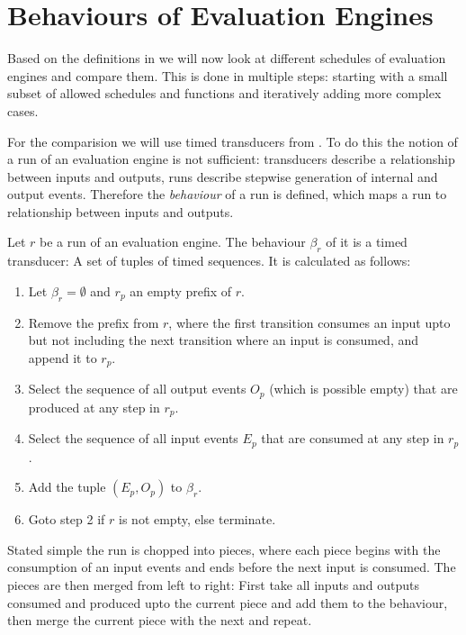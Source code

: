 \chapter{Behaviours of Evaluation Engines}
\label{sec:behaviours}

Based on the definitions in  we will now look at different schedules of evaluation engines and compare them.
This is done in multiple steps: starting with a small subset of allowed schedules and functions and iteratively adding more complex cases.

For the comparision we will use timed transducers from .
To do this the notion of a run of an evaluation engine is not sufficient: transducers describe a relationship between inputs and outputs, runs describe stepwise generation of internal and output events.
Therefore the \emph{behaviour} of a run is defined, which maps a run to relationship between inputs and outputs.

\begin{definition}[name = Behaviour of a Run]\label{def:behaviour_run}
  Let \(r\) be a run of an evaluation engine.
  The behaviour \(\beta_r\) of it is a timed transducer: A set of tuples of timed sequences.
  It is calculated as follows:
  \begin{enumerate}
    \item Let \(\beta_r = \emptyset\) and \(r_p\) an empty prefix of \(r\).
    \item Remove the prefix  from \(r\), where the first transition consumes an input upto but not including the next transition where an input is consumed, and append it to \(r_p\).
    \item Select the sequence of all output events \(O_p\) (which is possible empty) that are produced at any step in \(r_p\).
    \item Select the sequence of all input events \(E_p\) that are consumed at any step in \(r_p\).
    \item Add the tuple \((E_p,O_p)\) to \(\beta_r\).
    \item Goto step 2 if \(r\) is not empty, else terminate.
  \end{enumerate}

  Stated simple the run is chopped into pieces, where each piece begins with the consumption of an input events and ends before the next input is consumed.
  The pieces are then merged from left to right: First take all inputs and outputs consumed and produced upto the current piece and add them to the behaviour, then merge the current piece with the next and repeat.
\end{definition}

